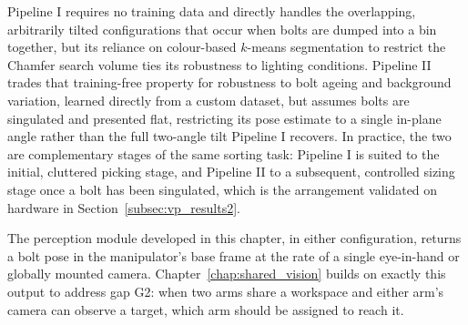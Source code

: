 Pipeline I requires no training data and directly handles the overlapping, arbitrarily tilted
configurations that occur when bolts are dumped into a bin together, but its reliance on
colour-based $k$-means segmentation to restrict the Chamfer search volume ties its robustness to
lighting conditions. Pipeline II trades that training-free property for robustness to bolt ageing
and background variation, learned directly from a custom dataset, but assumes bolts are singulated
and presented flat, restricting its pose estimate to a single in-plane angle rather than the full
two-angle tilt Pipeline I recovers. In practice, the two are complementary stages of the same
sorting task: Pipeline I is suited to the initial, cluttered picking stage, and Pipeline II to a
subsequent, controlled sizing stage once a bolt has been singulated, which is the arrangement
validated on hardware in Section~\ref{subsec:vp_results2}.

The perception module developed in this chapter, in either configuration, returns a bolt pose in
the manipulator's base frame at the rate of a single eye-in-hand or globally mounted camera.
Chapter~\ref{chap:shared_vision} builds on exactly this output to address gap G2: when two arms share a workspace and
either arm's camera can observe a target, which arm should be assigned to reach it.
